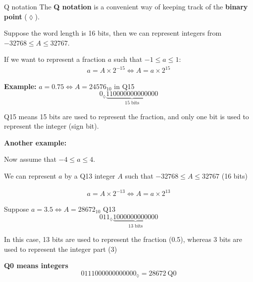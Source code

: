 \documentclass[10pt, aspectratio=169, handout]{beamer}
\begin{document}
%
\begin{frame}{Q notation}
	The \textbf{Q notation} is a convenient way of keeping track of the \textbf{binary point} ($\lozenge$).
	
	Suppose the word length is 16 bits, then we can represent integers from $-32768 \leq A \leq 32767$.
		
	If we want to represent a fraction $a$ such that $-1\leq a\leq 1$:
	\begin{align*}
	a = A\times 2^{-15} \Longleftrightarrow A = a\times 2^{15}
	\end{align*}
		
	\textbf{Example:}
	$a =  0.75 \Longleftrightarrow A = 24576_{10}$ in Q15
	\begin{equation*}
	0_\lozenge\underbrace{110000000000000}_{\text{15 bits}}
	\end{equation*}
		
	Q15 means 15 bits are used to represent the fraction, and only one bit is used to represent the integer (sign bit).
\end{frame}

%
\begin{frame}
	
	\textbf{Another example:}
	
	Now assume that $-4\leq a\leq 4$. 
	
	We can represent $a$ by a Q13 integer $A$ such that $-32768 \leq A \leq 32767$ (16 bits)
	
	\begin{align*}
	a = A\times 2^{-13} \Longleftrightarrow A = a\times 2^{13}
	\end{align*}
	
	Suppose $a =  3.5 \Longleftrightarrow A = 28672_{10}$ Q13
	\begin{equation*}
	011_\lozenge\underbrace{1000000000000}_{\text{13 bits}}
	\end{equation*}
	
	In this case, 13 bits are used to represent the fraction (0.5), whereas 3 bits are used to represent the integer part (3)
	
	\vspace{0.25cm}
	\textbf{Q0 means integers}
	\begin{equation*}
	0111000000000000_\lozenge = 28672~\text{Q0}
	\end{equation*}
\end{frame}
\end{document}

